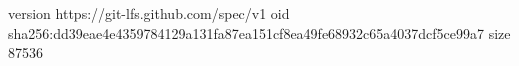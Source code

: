 version https://git-lfs.github.com/spec/v1
oid sha256:dd39eae4e4359784129a131fa87ea151cf8ea49fe68932c65a4037dcf5ce99a7
size 87536

